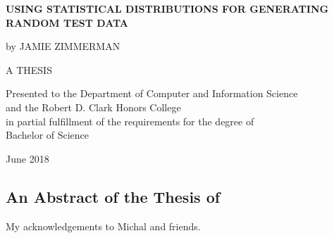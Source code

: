 \documentclass[12pt]{report}
\begin{document}
\begin{titlepage}
    \begin{center}
        \vspace*{1cm}
        
        \Large
        \textbf{USING STATISTICAL DISTRIBUTIONS FOR GENERATING RANDOM TEST DATA}
        
        \vspace{3.5cm}
        
        \large
        by
        \linebreak
        JAMIE ZIMMERMAN
        
        \vspace{3.5cm}
        
        \vfill

        \normalsize
        A THESIS
        \vspace{1.5cm}
        \begin{singlespace}
        Presented to the Department of Computer and Information Science \\
        and the Robert D. Clark Honors College \\
        in partial fulfillment of the requirements for the degree of \\
        Bachelor of Science
        \end{singlespace}
        
        \vspace{0.8cm}
        June 2018
        
    \end{center}
\end{titlepage}



\begin{romanpages}      %


\chapter*{\textbf{An Abstract of the Thesis of}}




\begin{acknowledgments}
My acknowledgements to Michal and friends.
\end{acknowledgments}

\tableofcontents
\vfill




\listoffigures
\listoftables
\printnomenclature[0.5in] %
\end{romanpages}        %
\end{document}
